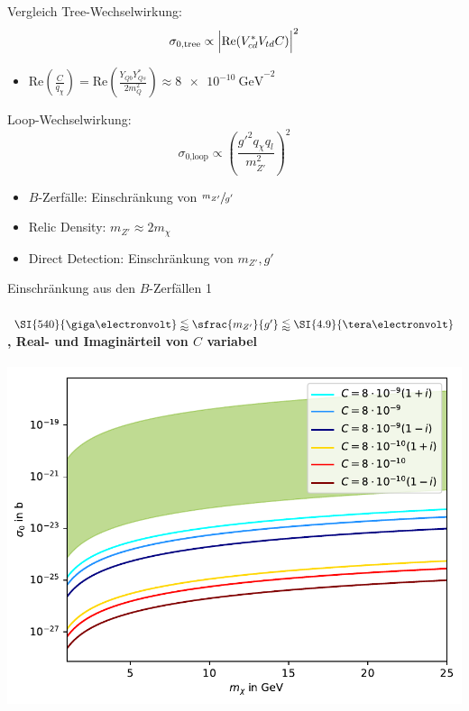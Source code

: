 \begin{frame}{Vergleich}
Tree-Wechselwirkung:
	\[ \sigma_\text{0,tree} \propto \Bigl|\text{Re}(V_{cd}^*V_{td}C)\Bigr|^2 \]
\begin{itemize}
	\item $\text{Re}\left(\frac{C}{q_\chi}\right) = \text{Re}\left(\frac{Y_{Qb}Y_{Qs}^*}{2m_Q^2}\right)\approx\SI{8e-10}{\giga\electronvolt}^{-2}$
\end{itemize}
Loop-Wechselwirkung:
	\[ \sigma_\text{0,loop} \propto \left(\frac{g'^2q_\chi q_l}{m_{Z'}^2}\right)^2 \]
\begin{itemize}
	\item $B$-Zerfälle: Einschränkung von $\sfrac{m_{Z'}}{g'}$
	\item Relic Density: $m_{Z'}\approx 2m_\chi$
	\item Direct Detection: Einschränkung von $m_{Z'},g'$
\end{itemize}
\end{frame}


\begin{frame}{Einschränkung aus den $B$-Zerfällen 1}
\framesubtitle{$\SI{540}{\giga\electronvolt}\lessapprox\sfrac{m_{Z'}}{g'}\lessapprox\SI{4.9}{\tera\electronvolt}$, Real- und Imaginärteil von $C$ variabel}
\includegraphics[width=.87\textwidth]{Bilder/Allgemein11.pdf}
\end{frame}


